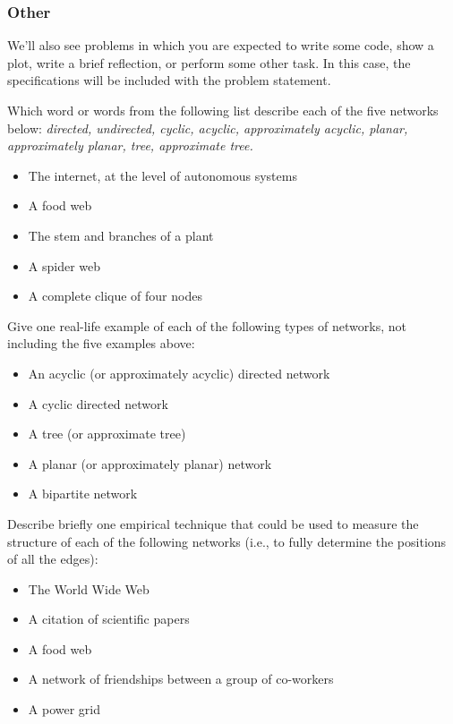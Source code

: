 \documentclass[11pt]{article}
\begin{document}
\begin{titlepage}
\subsubsection*{Other}

We'll also see problems in which you are expected to write some code, show a plot, write a brief reflection, or perform some other task. 
In this case, the specifications will be included with the problem statement. 


\end{titlepage}

\begin{tcolorbox}[title = 1. Network Examples (Newman 6.1)]
Which word or words from the following list describe each of the five networks below: {\em directed, undirected, cyclic, acyclic, approximately acyclic, planar, approximately planar, tree, approximate tree.}

\begin{itemize}
    \item The internet, at the level of autonomous systems
    \item A food web
    \item The stem and branches of a plant
    \item A spider web
    \item A complete clique of four nodes
\end{itemize}

Give one real-life example of each of the following types of networks, not including the five examples above:
\begin{itemize}
    \item An acyclic (or approximately acyclic) directed network
    \item A cyclic directed network
    \item A tree (or approximate tree)
    \item A planar (or approximately planar) network
    \item A bipartite network
\end{itemize}
Describe briefly one empirical technique that could be used to measure the structure of each of the following networks (i.e., to fully determine the positions of all the edges):
\begin{itemize}
    \item The World Wide Web
    \item A citation of scientific papers
    \item A food web
    \item A network of friendships between a group of co-workers
    \item A power grid
\end{itemize}
\end{tcolorbox}
\end{document}
